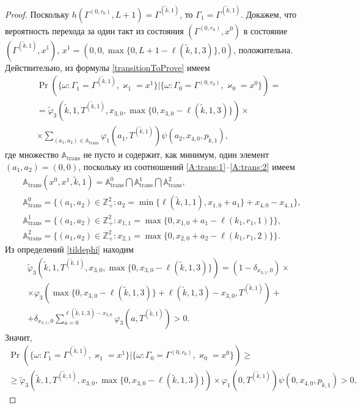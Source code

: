 \documentclass{report}
\begin{document}
\begin{proof}
Поскольку $h(\Gamma^{(0,r_0)}, L+1) = \Gamma^{(\tilde{k},1)}$, то $\Gamma_1 = \Gamma^{(\tilde{k},1)}$. Докажем, что вероятность перехода за один такт из состояния $(\Gamma^{(0,r_0)},x^0)$ в состояние $(\Gamma^{(\tilde{k},1)},x^1)$, $x^1 = (0,0,\max{\{0,L+1-\ell(\tilde{k},1,3)\}},0)$, положительна.
Действительно, из формулы \eqref{transitionToProve} имеем
\begin{multline*}
\Pr(\{\omega\colon \Gamma_{1}=\Gamma^{(\tilde{k},1)}, \varkappa_{1}=x^1\}|\{\omega\colon 
\Gamma_{0}=\Gamma^{(0,r_0)}, \varkappa_{0}=x^0\})=\\
=\widetilde{\varphi}_3(\tilde{k},1,T^{(\tilde{k},1)},x_{3,0},\max{\{0,x_{3,0} - \ell(\tilde{k},1,3)\}}) \times \\ \times
\sum_{(a_1,a_2)\in {\mathbb A}_{\mathrm{trans}}}\varphi_1(a_1,T^{(\tilde{k},1)})  \psi(a_2,x_{4,0}, p_{\tilde{k},1}),
\end{multline*}
где множество ${\mathbb A}_{\mathrm{trans}}$ не пусто и содержит, как минимум, один элемент $(a_1,a_2)=(0,0)$, поскольку из соотношений \eqref{A:trans:1}--\eqref{A:trans:2} имеем
\begin{align*}
&{\mathbb A}_{\mathrm{trans}}(x^0,x^1,\tilde{k},1) = {\mathbb A}_{\mathrm{trans}}^0 \bigcap {\mathbb A}_{\mathrm{trans}}^1\bigcap {\mathbb A}_{\mathrm{trans}}^2,\\
&{\mathbb A}_{\mathrm{trans}}^0 = \{(a_1,a_2) \in \mathbb{Z}_+^2 \colon a_2 = \min{\{\ell(\tilde{k},1,1), x_{1,0}+a_1}\} +x_{4,0}- x_{4,1}\},\\
&{\mathbb A}_{\mathrm{trans}}^1 = \{(a_1,a_2) \in \mathbb{Z}_+^2 \colon x_{1,1}=\max{\{0,x_{1,0}+a_1-\ell(k_1,r_1,1)\}}\},\\
& {\mathbb A}_{\mathrm{trans}}^2 = \{(a_1,a_2) \in \mathbb{Z}_+^2 \colon  x_{2,1} =\max{\{0,x_{2,0}+a_2-\ell(k_1,r_1,2)\}}\}.
\end{align*}
Из определений \eqref{tildephi} находим
\begin{multline*}
\widetilde{\varphi}_3(\tilde{k},1,T^{(\tilde{k},1)},x_{3,0},\max{\{0,x_{3,0} - \ell(\tilde{k},1,3)\}})= (1-\delta_{x_{3,1},0}) \times \\\times\varphi_3(\max{\{0,x_{3,0} - \ell(\tilde{k},1,3)\}} + \ell (\tilde{k},1,3) - x_{3,0},T^{(\tilde{k},1)} ) 
+\\+\delta_{x_{3,1},0} \sum_{a=0}^{\ell(\tilde{k},1,3)-x_{3,0}}\varphi_3 (a,T^{(\tilde{k},1)})>0.
\end{multline*}
Значит,
\begin{multline*}
\Pr(\{\omega\colon \Gamma_{1}=\Gamma^{(\tilde{k},1)}, \varkappa_{1}=x^1\}|\{\omega\colon 
\Gamma_{0}=\Gamma^{(0,r_0)}, \varkappa_{0}=x^0\})\geqslant \\
\geqslant \widetilde{\varphi}_3(\tilde{k},1,T^{(\tilde{k},1)},x_{3,0},\max{\{0,x_{3,0} - \ell(\tilde{k},1,3)\}})
\times
\varphi_1(0,T^{(\tilde{k},1)})  \psi(0,x_{4,0}, p_{\tilde{k},1}) > 0,
\end{multline*}


\end{proof}
\end{document}
